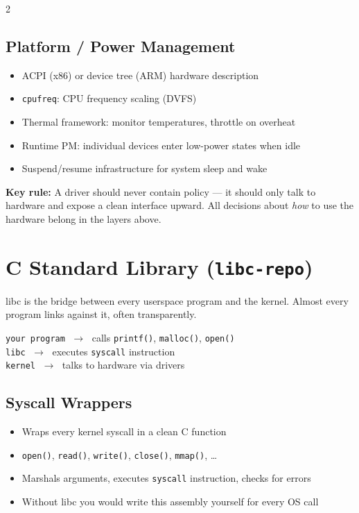 2\documentclass[11pt,a4paper]{article}
\begin{document}
\subsection{Platform / Power Management}
\begin{itemize}[noitemsep]
  \item ACPI (x86) or device tree (ARM) hardware description
  \item \texttt{cpufreq}: CPU frequency scaling (DVFS)
  \item Thermal framework: monitor temperatures, throttle on overheat
  \item Runtime PM: individual devices enter low-power states when idle
  \item Suspend/resume infrastructure for system sleep and wake
\end{itemize}

\begin{infobox}
\textbf{Key rule:} A driver should never contain policy --- it should only talk to hardware and expose a clean interface upward. All decisions about \textit{how} to use the hardware belong in the layers above.
\end{infobox}

\section{C Standard Library (\texttt{libc-repo})}

libc is the bridge between every userspace program and the kernel. Almost every program links against it, often transparently.

\begin{infobox}
\texttt{your program} $\;\rightarrow\;$ calls \texttt{printf()}, \texttt{malloc()}, \texttt{open()}\\
\texttt{libc} $\;\rightarrow\;$ executes \texttt{syscall} instruction\\
\texttt{kernel} $\;\rightarrow\;$ talks to hardware via drivers
\end{infobox}

\subsection{Syscall Wrappers}
\begin{itemize}[noitemsep]
  \item Wraps every kernel syscall in a clean C function
  \item \texttt{open()}, \texttt{read()}, \texttt{write()}, \texttt{close()}, \texttt{mmap()}, \ldots
  \item Marshals arguments, executes \texttt{syscall} instruction, checks for errors
  \item Without libc you would write this assembly yourself for every OS call
\end{itemize}
\end{document}
